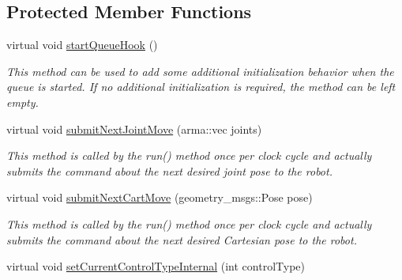 \subsection*{Protected Member Functions}
\begin{DoxyCompactItemize}
\item 
virtual void \hyperlink{classkukadu_1_1PlottingControlQueue_ae43df8bbe8df49fc3a20a134f0cb84c2}{start\+Queue\+Hook} ()\hypertarget{classkukadu_1_1PlottingControlQueue_ae43df8bbe8df49fc3a20a134f0cb84c2}{}\label{classkukadu_1_1PlottingControlQueue_ae43df8bbe8df49fc3a20a134f0cb84c2}

\begin{DoxyCompactList}\small\item\em This method can be used to add some additional initialization behavior when the queue is started. If no additional initialization is required, the method can be left empty. \end{DoxyCompactList}\item 
virtual void \hyperlink{classkukadu_1_1PlottingControlQueue_abcdd49af491df3aed56aada370df1b78}{submit\+Next\+Joint\+Move} (arma\+::vec joints)\hypertarget{classkukadu_1_1PlottingControlQueue_abcdd49af491df3aed56aada370df1b78}{}\label{classkukadu_1_1PlottingControlQueue_abcdd49af491df3aed56aada370df1b78}

\begin{DoxyCompactList}\small\item\em This method is called by the run() method once per clock cycle and actually submits the command about the next desired joint pose to the robot. \end{DoxyCompactList}\item 
virtual void \hyperlink{classkukadu_1_1PlottingControlQueue_a3447e691e812c0ca8390a05c00fe6621}{submit\+Next\+Cart\+Move} (geometry\+\_\+msgs\+::\+Pose pose)\hypertarget{classkukadu_1_1PlottingControlQueue_a3447e691e812c0ca8390a05c00fe6621}{}\label{classkukadu_1_1PlottingControlQueue_a3447e691e812c0ca8390a05c00fe6621}

\begin{DoxyCompactList}\small\item\em This method is called by the run() method once per clock cycle and actually submits the command about the next desired Cartesian pose to the robot. \end{DoxyCompactList}\item 
virtual void \hyperlink{classkukadu_1_1PlottingControlQueue_ad57f6b029d1acd9160702973b74c87de}{set\+Current\+Control\+Type\+Internal} (int control\+Type)\hypertarget{classkukadu_1_1PlottingControlQueue_ad57f6b029d1acd9160702973b74c87de}{}\label{classkukadu_1_1PlottingControlQueue_ad57f6b029d1acd9160702973b74c87de}


\end{DoxyCompactItemize}
